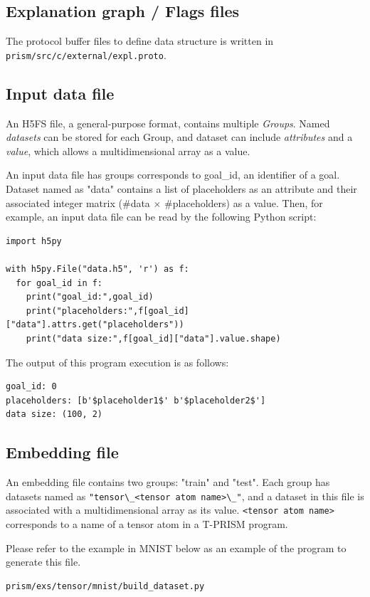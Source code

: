 \documentclass[a4paper]{report}
\begin{document}
\subsection{Explanation graph / Flags files}
The protocol buffer files to define data structure is written in 
\verb|prism/src/c/external/expl.proto|.

\subsection{Input data file}

An H5FS file, a general-purpose format, contains multiple {\it Groups}.
Named {\it datasets} can be stored for each Group, and dataset can include {\it attributes} and a {\it value}, which allows a multidimensional array as a value.

An input data file has groups corresponds to goal\_id, an identifier of a goal.
Dataset named as "data" contains a list of placeholders as an attribute
and their associated integer matrix ($\#$data $\times$  $\#$placeholders) as  a value.
Then, for example, an input data file can be read by the following Python script: 
\begin{verbatim}
import h5py

with h5py.File("data.h5", 'r') as f:
  for goal_id in f:
    print("goal_id:",goal_id)
    print("placeholders:",f[goal_id]["data"].attrs.get("placeholders"))
    print("data size:",f[goal_id]["data"].value.shape)
\end{verbatim}

The output of this program execution is as follows:
\begin{verbatim}
goal_id: 0
placeholders: [b'$placeholder1$' b'$placeholder2$']
data size: (100, 2)
\end{verbatim}


\subsection{Embedding file}

An embedding file contains two groups: "train" and "test".
Each group has datasets named as \verb|"tensor\_<tensor atom name>\_"|, and a dataset in this file is associated with a multidimensional array as its value.
\verb|<tensor atom name>| corresponds to a name of a tensor atom in a T-PRISM program.


Please refer to the example in MNIST below as an example of the program to generate this file.
\begin{verbatim}
prism/exs/tensor/mnist/build_dataset.py
\end{verbatim}
\end{document}
